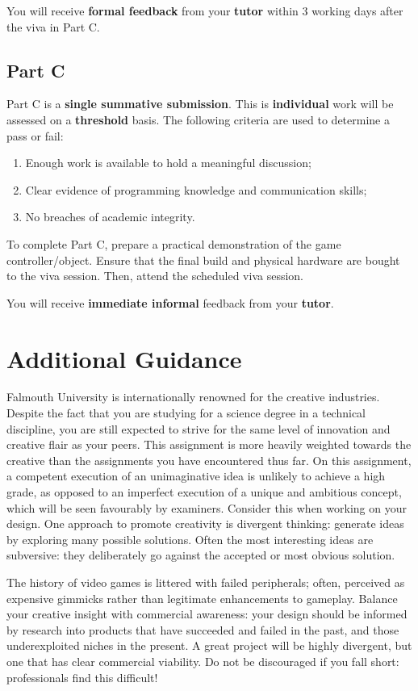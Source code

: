 \documentclass{../../fal_assignment}
\begin{document}
You will receive \textbf{formal feedback} from your \textbf{tutor} within 3 working days after the viva in Part C.

\subsection*{Part C}

Part C is a \textbf{single summative submission}. This is \textbf{individual} work will be assessed on a \textbf{threshold} basis. The following criteria are used to determine a pass or fail: 

\begin{enumerate}[label=(\alph*)]
	\item Enough work is available to hold a meaningful discussion; 
	\item Clear evidence of programming knowledge and communication skills; 
	\item No breaches of academic integrity. 
\end{enumerate}

To complete Part C, prepare a practical demonstration of the game controller/object. Ensure that the final build and physical hardware are bought to the viva session. Then, attend the scheduled viva session. 

You will receive \textbf{immediate informal} feedback from your \textbf{tutor}.

\section*{Additional Guidance}
Falmouth University is internationally renowned for the creative industries. Despite the fact that you are studying for a science degree in a technical discipline, you are still expected to strive for the same level of innovation and creative flair as your peers. This assignment is more heavily weighted towards the creative than the assignments you have encountered thus far. On this assignment, a competent execution of an unimaginative idea is unlikely to achieve a high grade, as opposed to an imperfect execution of a unique and ambitious concept, which will be seen favourably by examiners. Consider this when working on your design. One approach to promote creativity is divergent thinking: generate ideas by exploring many possible solutions. Often the most interesting ideas are subversive: they deliberately go against the accepted or most obvious solution.

The history of video games is littered with failed peripherals; often, perceived as expensive gimmicks rather than legitimate enhancements to gameplay. Balance your creative insight with commercial awareness: your design should be informed by research into products that have succeeded and failed in the past, and those underexploited niches in the present. A great project will be highly divergent, but one that has clear commercial viability. Do not be discouraged if you fall short: professionals find this difficult! 
\end{document}
